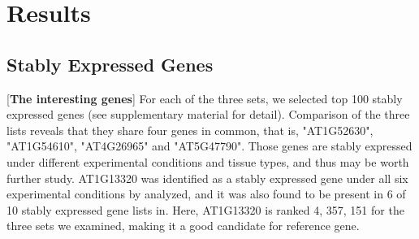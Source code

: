 \documentclass[11pt, a4paper]{article}
\begin{document}
 \section{Results}
 
 \subsection{Stably Expressed Genes}
 [\textbf{The interesting genes}]
  For each of the three sets, we selected top 100 stably expressed genes (see supplementary material for detail). %
Comparison of the three lists reveals that they share four genes in common, that is, "AT1G52630", "AT1G54610", "AT4G26965" and "AT5G47790".  Those genes are stably expressed under different experimental conditions and tissue types, and thus may be worth further study. AT1G13320 was identified  as a stably expressed gene under all six experimental conditions by \cite{hong2010identification} analyzed, and it was also found to be present in 6 of 10 stably expressed gene lists in\cite{czechowski2005genome}.  Here, AT1G13320 is ranked 4, 357, 151 for the three sets we examined, making it a good candidate for reference gene.
\end{document}
